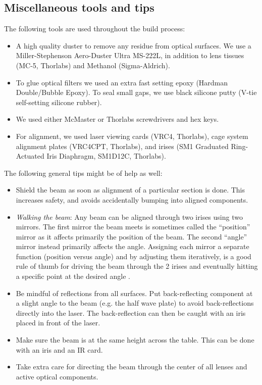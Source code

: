 \documentclass[10pt,letterpaper]{article}
\begin{document}
\subsection{Miscellaneous tools and tips}
The following tools are used throughout the build process:
\begin{itemize}
    \item A high quality duster to remove any residue from optical surfaces. We use a Miller-Stephenson Aero-Duster Ultra MS-222L, in addition to lens tissues (MC-5, Thorlabs) and Methanol (Sigma-Aldrich).
    \item To glue optical filters we used an extra fast setting epoxy (Hardman Double/Bubble Epoxy). To seal small gaps, we use black silicone putty (V-tie self-setting silicone rubber).
    \item We used either McMaster or Thorlabs screwdrivers and hex keys.
    \item For alignment, we used laser viewing cards (VRC4, Thorlabs), cage system alignment plates (VRC4CPT, Thorlabs), and irises (SM1 Graduated Ring-Actuated Iris Diaphragm, SM1D12C, Thorlabs).
\end{itemize}
%
The following general tips might be of help as well:
\begin{itemize}
    \item Shield the beam as soon as alignment of a particular section is done. This increases safety, and avoids accidentally bumping into aligned components.
    \item \textit{Walking the beam}: Any beam can be aligned through two irises using two mirrors. The first mirror the beam meets is sometimes called the ``position'' mirror as it affects primarily the position of the beam. The second ``angle'' mirror instead primarily affects the angle. Assigning each mirror a separate function (position versus angle) and by adjusting them iteratively, is a good rule of thumb for driving the beam through the 2 irises and eventually hitting a specific point at the desired angle \cite{Thorlabs}. 
    \item Be mindful of reflections from all surfaces. Put back-reflecting component at a slight angle to the beam (e.g. the half wave plate) to avoid back-reflections directly into the laser. The back-reflection can then be caught with an iris placed in front of the laser.
    \item Make sure the beam is at the same height across the table. This can be done with an iris and an IR card. 
    \item Take extra care for directing the beam through the center of all lenses and active optical components.
\end{itemize}
\end{document}
